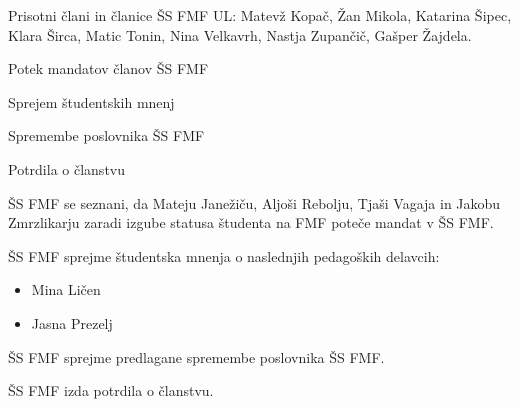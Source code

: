 \documentclass{seja}
\begin{document}
Prisotni člani in članice ŠS FMF UL:
Matevž Kopač, Žan Mikola, Katarina Šipec, Klara Širca, Matic Tonin, Nina Velkavrh, Nastja Zupančič, Gašper Žajdela.

\begin{red}
	\item
	Potek mandatov članov ŠS FMF
    \item
    Sprejem študentskih mnenj
	\item 
	Spremembe poslovnika ŠS FMF
    \item Potrdila o članstvu
\end{red}

\begin{ad}
    \item
     ŠS FMF se seznani, da Mateju Janežiču, Aljoši Rebolju, Tjaši Vagaja in Jakobu Zmrzlikarju zaradi izgube statusa študenta na FMF
poteče mandat v ŠS FMF.
    
    \item
    \begin{sklep*}
    ŠS FMF sprejme študentska mnenja o naslednjih
    pedagoških delavcih:
    \begin{itemize}
        \item Mina Ličen
        \item Jasna Prezelj
    \end{itemize}
    \end{sklep*}
    
    \item
    \begin{sklep*}
    ŠS FMF sprejme predlagane spremembe poslovnika ŠS FMF.
    \end{sklep*}
    
    \item
	\begin{sklep*}
		ŠS FMF izda potrdila o članstvu.
	\end{sklep*}
\end{ad}

\makeatletter \global\let\@enddocumenthook\@empty \makeatother
{}
\end{document}
